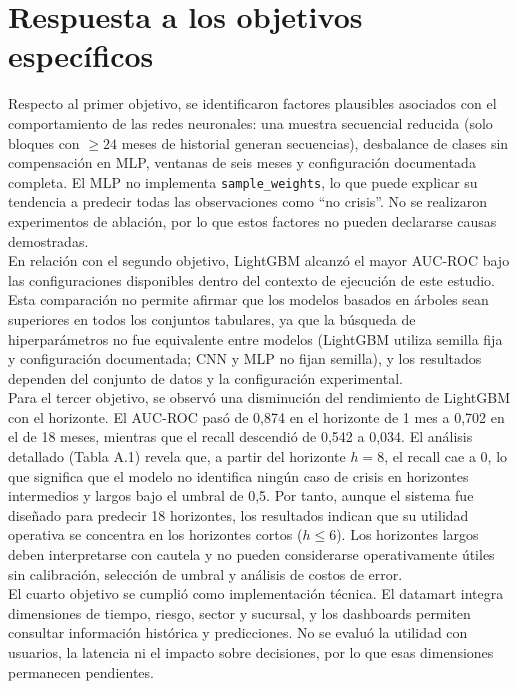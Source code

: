 \section{Respuesta a los objetivos específicos}

Respecto al primer objetivo, se identificaron factores plausibles asociados con el comportamiento de las redes neuronales: una muestra secuencial reducida (solo bloques con $\geq 24$ meses de historial generan secuencias), desbalance de clases sin compensación en MLP, ventanas de seis meses y configuración documentada completa. El MLP no implementa \texttt{sample\_weights}, lo que puede explicar su tendencia a predecir todas las observaciones como ``no crisis''. No se realizaron experimentos de ablación, por lo que estos factores no pueden declararse causas demostradas.\\

En relación con el segundo objetivo, LightGBM alcanzó el mayor AUC-ROC bajo las configuraciones disponibles dentro del contexto de ejecución de este estudio. Esta comparación no permite afirmar que los modelos basados en árboles sean superiores en todos los conjuntos tabulares, ya que la búsqueda de hiperparámetros no fue equivalente entre modelos (LightGBM utiliza semilla fija y configuración documentada; CNN y MLP no fijan semilla), y los resultados dependen del conjunto de datos y la configuración experimental.\\

Para el tercer objetivo, se observó una disminución del rendimiento de LightGBM con el horizonte. El AUC-ROC pasó de 0,874 en el horizonte de 1 mes a 0,702 en el de 18 meses, mientras que el recall descendió de 0,542 a 0,034. El análisis detallado (Tabla A.1) revela que, a partir del horizonte $h = 8 $, el recall cae a 0, lo que significa que el modelo no identifica ningún caso de crisis en horizontes intermedios y largos bajo el umbral de 0,5. Por tanto, aunque el sistema fue diseñado para predecir 18 horizontes, los resultados indican que su utilidad operativa se concentra en los horizontes cortos ($ h \le 6 $). Los horizontes largos deben interpretarse con cautela y no pueden considerarse operativamente útiles sin calibración, selección de umbral y análisis de costos de error.\\

El cuarto objetivo se cumplió como implementación técnica. El datamart integra dimensiones de tiempo, riesgo, sector y sucursal, y los dashboards permiten consultar información histórica y predicciones. No se evaluó la utilidad con usuarios, la latencia ni el impacto sobre decisiones, por lo que esas dimensiones permanecen pendientes.

